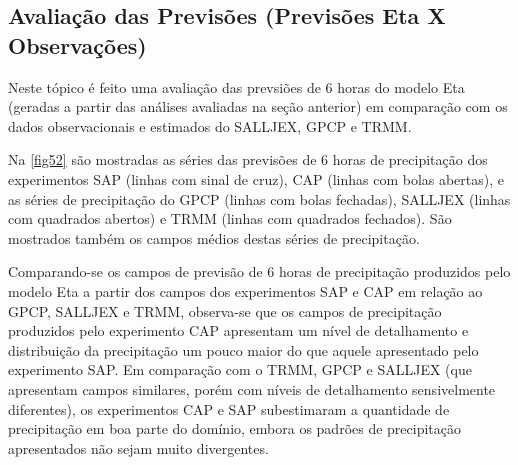 \subsection{Avaliação das Previsões (Previsões Eta X Observações)}
\label{ss:avalprev}

Neste tópico é feito uma avaliação das prevsiões de 6 horas do modelo Eta (geradas a partir das análises avaliadas na seção anterior) em comparação com os dados observacionais e estimados do SALLJEX, GPCP e TRMM.

Na \autoref{fig52} são mostradas as séries das previsões de 6 horas de precipitação dos experimentos SAP (linhas com sinal de cruz), CAP (linhas com bolas abertas),  e as séries de precipitação do GPCP (linhas com bolas fechadas),  SALLJEX (linhas com quadrados abertos) e TRMM (linhas com quadrados fechados). São mostrados também os campos médios destas séries de precipitação.

Comparando-se os campos de previsão de 6 horas de precipitação produzidos pelo modelo Eta a partir dos campos dos experimentos SAP e CAP em relação ao GPCP, SALLJEX e TRMM, observa-se que os campos de precipitação produzidos pelo experimento CAP apresentam um nível de detalhamento e distribuição da precipitação um pouco maior do que aquele apresentado pelo experimento SAP. Em comparação com o TRMM, GPCP e SALLJEX (que apresentam campos similares, porém com níveis de detalhamento sensivelmente diferentes), os experimentos CAP e SAP subestimaram a quantidade de precipitação em boa parte do domínio, embora os padrões de precipitação apresentados não sejam muito divergentes. 

